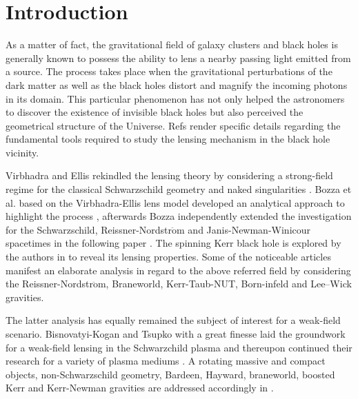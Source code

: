 \documentclass[final,5p,times,twocolumn,unknownkeysallowed]{elsarticle}
\begin{document}
\linenumbers

\section{Introduction} \label{intro}
As a matter of fact, the gravitational field of galaxy clusters and black holes is generally known to possess the ability to lens a nearby
passing light emitted from a source. The process takes place when the gravitational perturbations of the dark matter as well as the black holes
distort and magnify the incoming photons in its domain. This particular phenomenon
has not only helped the astronomers to discover the existence of invisible black holes but also
perceived the geometrical structure of the Universe. Refs \cite{Synge:1960b,Schnei:1999a,Perlick:2000a,Perlick:2004a}
render specific details regarding the fundamental tools required to study the lensing mechanism in the black hole vicinity.

Virbhadra and Ellis rekindled the lensing theory by considering a strong-field regime for the classical Schwarzschild
geometry and naked singularities \cite{Virbha:2000a,Virbha:2002a}. Bozza et al. based on the
Virbhadra-Ellis lens model developed an analytical approach to highlight the process \cite{Bozza:2001a}, afterwards Bozza
independently extended the investigation for the Schwarzschild, Reissner-Nordstr$\mathrm{\ddot{o}}$m and Janis-Newman-Winicour spacetimes
in the following paper \cite{Bozza:2002b}. The spinning Kerr black hole is explored by the authors in \cite{Bozza:2003a,Sevb:2004a,Bozza:2005a,Bozza:2006a}
to reveal its lensing properties. Some of the noticeable articles \cite{Eiroa:2002b,Eiroa:2004a,Eiroa:2005a,Virbha:2009b,Wei:2012b,Sotani:2015a,Zhao:2017a,Chak:2017a,Jin:2020a}
manifest an elaborate analysis in regard to the above referred field by considering the Reissner-Nordstr$\mathrm{\ddot{o}}$m, Braneworld,
Kerr-Taub-NUT, Born-infeld and Lee–Wick gravities.

The latter analysis has equally remained the subject of interest for a weak-field scenario. Bisnovatyi-Kogan and Tsupko with a great finesse
laid the groundwork for a weak-field lensing in the Schwarzchild  plasma \cite{Bin:2010a} and thereupon continued
their research for a variety of plasma mediums \cite{Tsp:2011a,Tsp:2014a,Tsp:2015a,Bis:2017a}. A rotating massive and compact objects,
non-Schwarzschild geometry, Bardeen, Hayward, braneworld, boosted Kerr
and Kerr-Newman gravities are addressed accordingly in \cite{Abu:2013a,Chak:2018a,Turi:2019a,Far:2016a,Abu:2017aa,Abu:2017a,Car:2018a,Babar:2020a,Chow:2020a,Far:2021a}.
\end{document}
